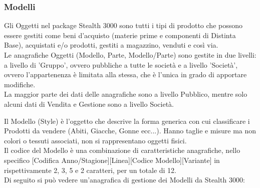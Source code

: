 \subsubsection{Modelli}
Gli Oggetti nel package Stealth 3000 sono tutti i tipi di prodotto che possono essere gestiti come beni d’acquisto (materie prime e componenti di Distinta Base), acquistati e/o prodotti, gestiti a magazzino, venduti e così via. \\
Le anagrafiche Oggetti (Modello, Parte, Modello/Parte) sono gestite in due livelli: a livello di 'Gruppo', ovvero pubbliche a tutte le società e a livello 'Società', ovvero l'appartenenza è limitata alla stessa, che è l'unica in grado di apportare modifiche.\\
 La maggior parte dei dati delle anagrafiche sono a livello Pubblico, mentre solo alcuni dati di Vendita e Gestione sono a livello Società.

Il Modello (Style) è l’oggetto che descrive la forma generica con cui classificare i Prodotti da vendere (Abiti, Giacche, Gonne ecc...). Hanno taglie e misure ma non colori o tessuti associati, non si rappresentano oggetti fisici.\\ 
Il codice del Modello è una combinazione di caratteristiche anagrafiche, nello specifico [Codifica Anno/Stagione][Linea][Codice Modello][Variante] in rispettivamente 2, 3, 5 e 2 caratteri, per un totale di 12.\\
Di seguito si può vedere un'anagrafica di gestione dei Modelli da Stealth 3000:


